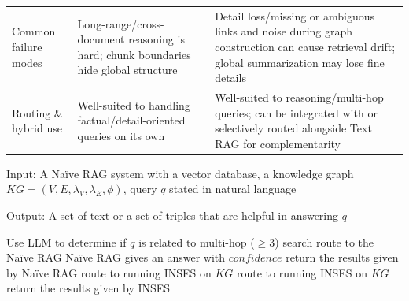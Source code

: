 \documentclass{article}
\theoremstyle{plain}
\theoremstyle{definition}
\theoremstyle{remark}
\begin{document}
\begin{table}[htb]
\begin{tabularx}{\linewidth}{@{}p{3.1cm} X X@{}}
Common failure modes & Long-range/cross-document reasoning is hard; chunk boundaries hide global structure & Detail loss/missing or ambiguous links and noise during graph construction can cause retrieval drift; global summarization may lose fine details \\
Routing \& hybrid use & Well-suited to handling factual/detail-oriented queries on its own & Well-suited to reasoning/multi-hop queries; can be integrated with or selectively routed alongside Text RAG for complementarity \\
\bottomrule
\end{tabularx}
\end{table}


\begin{algorithm}[htb]
\caption{Router Algorithm}
\label{algo2}
Input: A Naïve RAG system with a vector database,  a knowledge graph $KG = (V, E, \lambda_V, \lambda_E, \phi)$, query $q$ stated in natural language

Output: A set of text or a set of triples that are helpful in answering $q$
\begin{algorithmic}[1] %
\STATE Use LLM to determine if $q$ is related to multi-hop ($\ge$3) search
    \STATE route to the Naïve RAG
    \STATE Naïve RAG gives an answer with $confidence$
        \STATE return the results given by Naïve RAG
    \ELSE
        \STATE route to running INSES on $KG$
    \ENDIF
\ELSE
    \STATE route to running INSES on $KG$
\ENDIF
\STATE return the results given by INSES
\end{algorithmic}
\end{algorithm}
\end{document}
